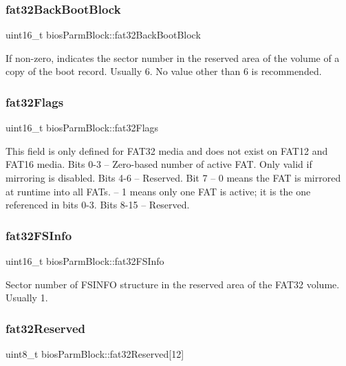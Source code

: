\subsubsection{\texorpdfstring{fat32\+Back\+Boot\+Block}{fat32BackBootBlock}}
{\footnotesize\ttfamily uint16\+\_\+t bios\+Parm\+Block\+::fat32\+Back\+Boot\+Block}

If non-\/zero, indicates the sector number in the reserved area of the volume of a copy of the boot record. Usually 6. No value other than 6 is recommended. \mbox{\label{structbios_parm_block_a626ac3dc473d764688b8171916eecf44}} 
\subsubsection{\texorpdfstring{fat32\+Flags}{fat32Flags}}
{\footnotesize\ttfamily uint16\+\_\+t bios\+Parm\+Block\+::fat32\+Flags}

This field is only defined for F\+A\+T32 media and does not exist on F\+A\+T12 and F\+A\+T16 media. Bits 0-\/3 -- Zero-\/based number of active F\+AT. Only valid if mirroring is disabled. Bits 4-\/6 -- Reserved. Bit 7 -- 0 means the F\+AT is mirrored at runtime into all F\+A\+Ts. -- 1 means only one F\+AT is active; it is the one referenced in bits 0-\/3. Bits 8-\/15 -- Reserved. \mbox{\label{structbios_parm_block_a25ea392d8284e6c1d007cb8fcad4b86c}} 
\subsubsection{\texorpdfstring{fat32\+F\+S\+Info}{fat32FSInfo}}
{\footnotesize\ttfamily uint16\+\_\+t bios\+Parm\+Block\+::fat32\+F\+S\+Info}

Sector number of F\+S\+I\+N\+FO structure in the reserved area of the F\+A\+T32 volume. Usually 1. \mbox{\label{structbios_parm_block_a351f87fe3446b1a71963a30bbdc23218}} 
\subsubsection{\texorpdfstring{fat32\+Reserved}{fat32Reserved}}
{\footnotesize\ttfamily uint8\+\_\+t bios\+Parm\+Block\+::fat32\+Reserved\mbox{[}12\mbox{]}}

